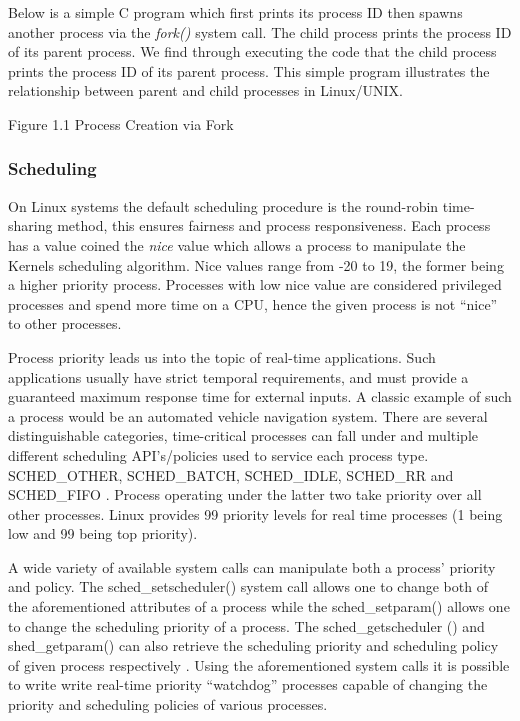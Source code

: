 	\normalfont \indent Below is a simple C program which first prints its process ID then spawns another process via the \textit{fork()} system call. The child process prints the process ID of its parent process. We find through executing the code that the child process prints the process ID of its parent process. This simple
program illustrates the relationship between parent and child processes in Linux/UNIX.


\begin{center}
Figure 1.1 Process Creation via Fork  
\end{center}

    \subsubsection{\bf Scheduling}
      \normalfont \indent On Linux systems the default scheduling procedure is the round-robin time-sharing method, this ensures fairness and process responsiveness. Each process has a value coined the \textit{nice} value which allows a process to manipulate the Kernels scheduling algorithm. Nice values range from -20 to 19, the former being a higher priority process.  Processes with low nice value are considered privileged processes and spend more time on a CPU, hence the given process is not “nice” to other processes.

      \normalfont \indent Process priority leads us into the topic of real-time applications. Such applications usually have strict temporal requirements, and must provide a guaranteed maximum response time for external inputs. A classic example of such a process would be an automated vehicle navigation system. There are several distinguishable categories, time-critical processes can fall under and multiple different scheduling API’s/policies used to service each process type. SCHED\_OTHER, SCHED\_BATCH, SCHED\_IDLE, SCHED\_RR and SCHED\_FIFO \cite{linuxProgInterface2010}. Process operating under the latter two take priority over all other processes. Linux provides 99 priority levels for real time processes (1 being low and 99 being top priority).

      \normalfont \indent A wide variety of available system calls can manipulate both a process’ priority and policy. The sched\_setscheduler() system call allows one to change both of the aforementioned attributes of a process while the sched\_setparam() allows one to change the scheduling priority of a process. The sched\_getscheduler () and  shed\_getparam() can also retrieve the scheduling priority and scheduling policy of given process respectively \cite{linuxProgInterface2010}. Using the aforementioned system calls it is possible to write write real-time priority “watchdog” processes capable of changing the priority and scheduling policies of various processes.

